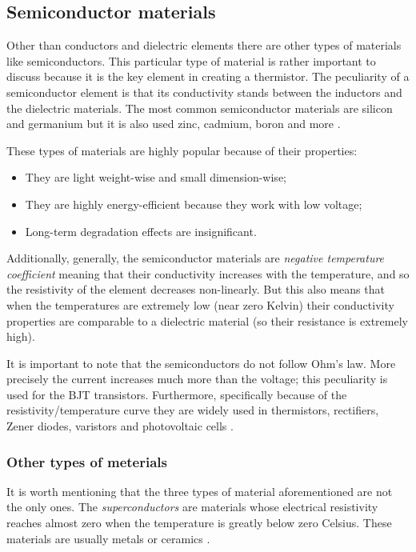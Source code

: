\subsection{Semiconductor materials}
Other than conductors and dielectric elements there are other types of materials like semiconductors. This particular type of material is rather important to discuss because it is the key element in creating a thermistor. The peculiarity of a semiconductor element is that its conductivity stands between the inductors and the dielectric materials. The most common semiconductor materials are silicon and germanium but it is also used zinc, cadmium, boron and more \cite{Gupta20163}.

These types of materials are highly popular because of their properties:
\vspace{-5px}\begin{itemize}
\renewcommand*{\labelitemi}{$\circ$}
\setlength{\itemsep}{-2px}
    \item They are light weight-wise and small dimension-wise;
    \item They are highly energy-efficient because they work with low voltage;
    \item Long-term degradation effects are insignificant.
\end{itemize}

\noindent Additionally, generally, the semiconductor materials are \textsl{negative temperature coefficient} meaning that their conductivity increases with the temperature, and so the resistivity of the element decreases non-linearly. But this also means that when the temperatures are extremely low (near zero Kelvin) their conductivity properties are comparable to a dielectric material (so their resistance is extremely high).

It is important to note that the semiconductors do not follow Ohm's law. More precisely the current increases much more than the voltage; this peculiarity is used for the BJT transistors. Furthermore, specifically because of the resistivity/temperature curve they are widely used in thermistors, rectifiers, Zener diodes, varistors and photovoltaic cells \cite{Gupta20163}.


\subsubsection*{Other types of meterials}
It is worth mentioning that the three types of material aforementioned are not the only ones. The \textsl{superconductors} are materials whose electrical resistivity reaches almost zero when the temperature is greatly below zero Celsius. These materials are usually metals or ceramics \cite{Gupta20163}.

